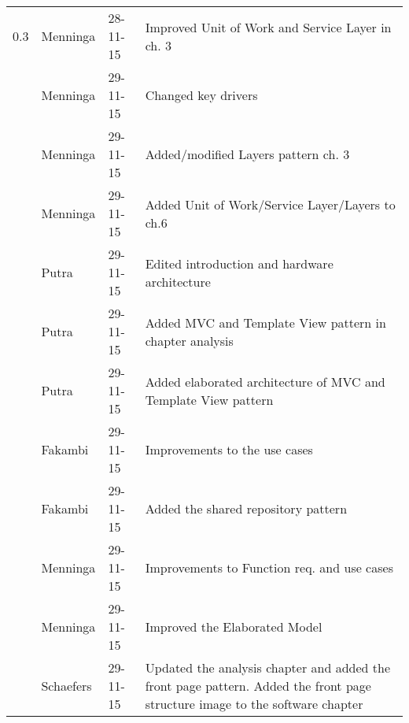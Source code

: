 \begin{longtable}{L{} L{} L{} L{}}
				0.3 & Menninga  & 28-11-15 & Improved Unit of Work and Service Layer in ch. 3 \\
					& Menninga  & 29-11-15 & Changed key drivers \\
					& Menninga  & 29-11-15 & Added/modified Layers pattern ch. 3 \\
					& Menninga  & 29-11-15 & Added Unit of Work/Service Layer/Layers to ch.6 \\
					& Putra		& 29-11-15 & Edited introduction and hardware architecture \\
					& Putra		& 29-11-15 & Added MVC and Template View pattern in chapter analysis\\
					& Putra		& 29-11-15 & Added elaborated architecture of MVC and Template View pattern\\
					& Fakambi   & 29-11-15 & Improvements to the use cases \\
					& Fakambi   & 29-11-15 & Added the shared repository pattern \\
					& Menninga  & 29-11-15 & Improvements to Function req. and use cases\\
					& Menninga  & 29-11-15 & Improved the Elaborated Model \\
					& Schaefers & 29-11-15 & Updated the analysis chapter and added the front page pattern. Added the front page structure image to the software chapter \\


\end{longtable}
